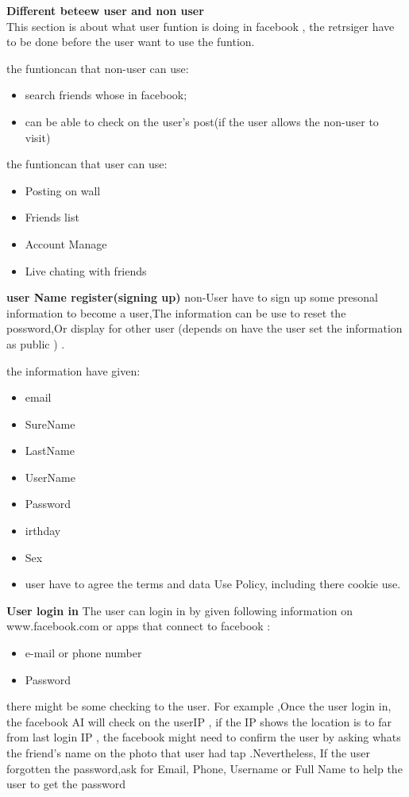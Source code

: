 \textbf{Different beteew user and non user}\\
This section is about what user funtion is doing in facebook , the retrsiger
have to be done before the user want to use the funtion.

the funtioncan that non-user can use:
\begin{itemize}
\item search friends whose in facebook;
\item can be able to check on the user's post(if the user allows the non-user
      to visit)
\end{itemize}

the funtioncan that user can use:
\begin{itemize}
\item Posting on wall
\item Friends list 
\item Account Manage
\item Live chating with friends
\end{itemize}

\textbf{user Name register(signing up)}
non-User have to sign up some presonal information to become a user,The
information can be use to reset the possword,Or display for other user (depends
on have the user set the information as public ) .

the information have given:
\begin{itemize}
\item email
\item SureName
\item LastName
\item UserName
\item Password
\item irthday
\item Sex
\item user have to agree the terms and data Use Policy, including there cookie
      use.
\end{itemize}

\textbf{User login in}
The user can login in by given following information on www.facebook.com or apps
that connect to facebook : 

\begin{itemize}
\item e-mail or phone number 
\item Password 
\end{itemize}

there might be some checking to the user. For example ,Once the user login in,
the facebook AI will check on the userIP , if the IP shows the location is to
far from last login IP , the facebook might need to confirm the user by asking
whats the friend's name on the photo that user had tap .Nevertheless, If the
user forgotten the password,ask for Email, Phone, Username or Full Name to help
the user to get the password
